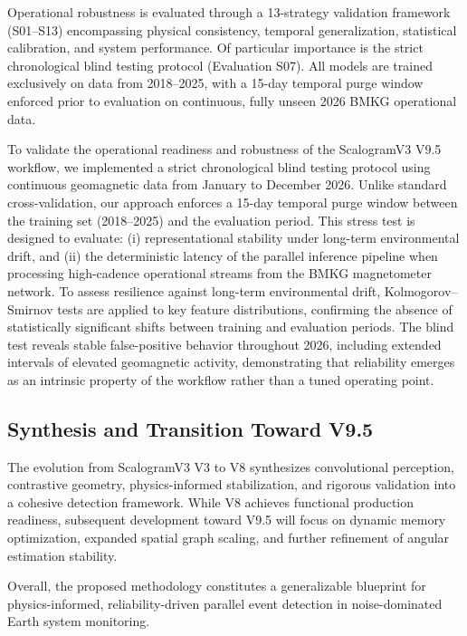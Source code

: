 \documentclass[a4paper,fleqn]{cas-sc}
\begin{document}
Operational robustness is evaluated through a 13-strategy validation framework (S01–S13) encompassing physical consistency, temporal generalization, statistical calibration, and system performance. Of particular importance is the strict chronological blind testing protocol (Evaluation S07). All models are trained exclusively on data from 2018–2025, with a 15-day temporal purge window enforced prior to evaluation on continuous, fully unseen 2026 BMKG operational data.

To validate the operational readiness and robustness of the ScalogramV3 V9.5 workflow, we implemented a strict chronological blind testing protocol using continuous geomagnetic data from January to December 2026. Unlike standard cross-validation, our approach enforces a 15-day temporal purge window between the training set (2018--2025) and the evaluation period. This stress test is designed to evaluate: (i) representational stability under long-term environmental drift, and (ii) the deterministic latency of the parallel inference pipeline when processing high-cadence operational streams from the BMKG magnetometer network. To assess resilience against long-term environmental drift, Kolmogorov–Smirnov tests are applied to key feature distributions, confirming the absence of statistically significant shifts between training and evaluation periods. The blind test reveals stable false-positive behavior throughout 2026, including extended intervals of elevated geomagnetic activity, demonstrating that reliability emerges as an intrinsic property of the workflow rather than a tuned operating point.

\subsection{Synthesis and Transition Toward V9.5}

The evolution from ScalogramV3 V3 to V8 synthesizes convolutional perception, contrastive geometry, physics-informed stabilization, and rigorous validation into a cohesive detection framework. While V8 achieves functional production readiness, subsequent development toward V9.5 will focus on dynamic memory optimization, expanded spatial graph scaling, and further refinement of angular estimation stability.

Overall, the proposed methodology constitutes a generalizable blueprint for physics-informed, reliability-driven parallel event detection in noise-dominated Earth system monitoring.
\end{document}
